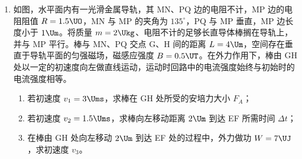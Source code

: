 \documentclass[\gkver]{gaokaozhenti}
\begin{document}
\begin{enumerate}
{$G\frac{L}{2}\sin30^{\circ}=\frac{qU_{1}}{d}L\sin30^{\circ}$①，

解得 $G=\frac{2qU_{1}}{d}$。

（2）金属板转过 $\alpha$ 角后，同样满足力矩平衡，有

$G\frac{L}{2}\sin30^{\circ}=\frac{qU_{2}}{d\cos15^{\circ}}L\sin45^{\circ}$②，

联立①、②式解得

$U_{2}=\frac{\sin30^{\circ}\cos15^{\circ}}{\sin45^{\circ}}U_{1}=\frac{\sqrt{3}+1}{4}U_{1}$。

（3）该同学的结论错误。因为上板接地，当板旋转 $\alpha$ 角度时，板间电场强度发生变化，电场的零势能面改变了，带电小球所在处相对零势能面的位置也改变了。所以，带电小球的电势能也改变了。

设带电小球与零势能面间的电势差为 $U'$，

金属板转动前 $U_{1}'=\frac{L\cos30^{\circ}}{d}U_{1}=\frac{\sqrt{3}}{4}U_{1}$，

电势能 $W_{1}=qU_{1}'=\frac{\sqrt{3}}{4}qU_{1}$，

金属板转动后 $U_{2}'=\frac{L\cos45^{\circ}}{d\cos15^{\circ}}U_{2}=\frac{1}{4}U_{1}$，

电势能 $W_{2}=qU_{2}'=\frac{1}{4}qU_{1}$。
}

\item
如图，水平面内有一光滑金属导轨，其 MN、PQ 边的电阻不计，MP 边的电阻阻值 $R = 1.5\UO$，MN 与 MP 的夹角为 $135^{\circ}$，PQ 与 MP 垂直，MP 边长度小于 $1\Um$。将质量 $m = 2\Ukg$、电阻不计的足够长直导体棒搁在导轨上，并与 MP 平行。棒与 MN、PQ 交点 G、H 间的距离 $L = 4\Um$，空间存在垂直于导轨平面的匀强磁场，磁感应强度 $B = 0.5\UT$。在外力作用下，棒由 GH 处以一定的初速度向左做直线运动，运动时回路中的电流强度始终与初始时的电流强度相等。
\begin{enumerate}
	\item
	若初速度 $v_{1} = 3\Ums$，求棒在 GH 处所受的安培力大小 $F_{A}$；
	\item
	若初速度 $v_{2} = 1.5\Ums$，求棒向左移动距离 $2\Um$ 到达 EF 所需时间 $\Delta t$；
	\item
	在棒由 GH 处向左移动 $2\Um$ 到达 EF 处的过程中，外力做功 $W = 7\UJ$，求初速度 $v_{3}$。
\end{enumerate}
\onepicture[align=right, h=4.66cm]{}
\end{enumerate}
\end{document}
